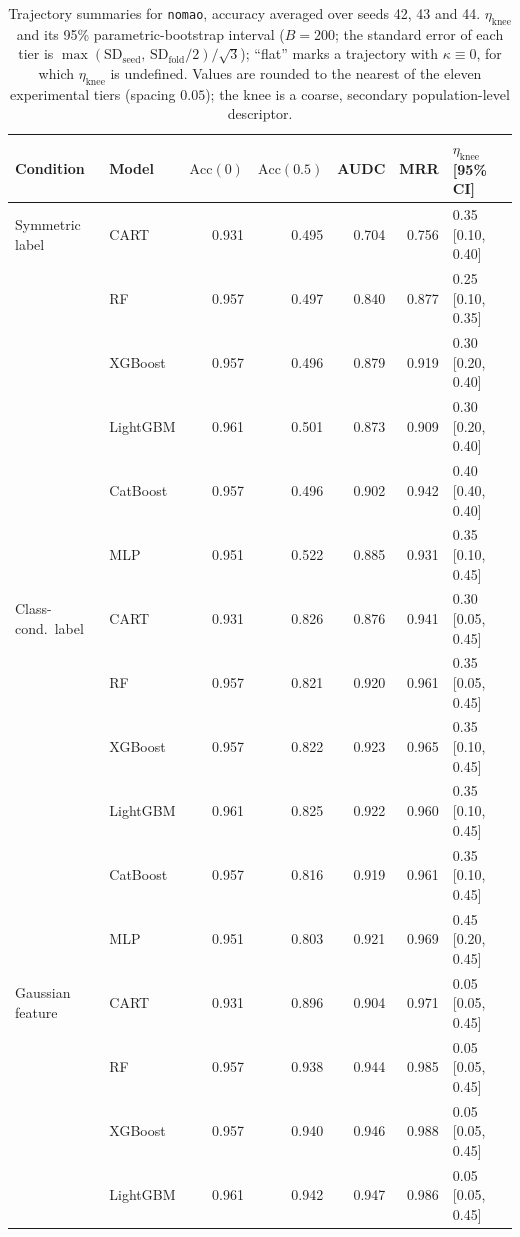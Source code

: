\documentclass[pdflatex,sn-mathphys]{sn-jnl}
\theoremstyle{thmstyleone}
\begin{document}
\begin{table}[htbp]
\centering
\scriptsize
\setlength{\tabcolsep}{3.5pt}
\caption{Trajectory summaries for \texttt{nomao}, accuracy averaged over seeds 42, 43 and 44. $\eta_{\mathrm{knee}}$ and its 95\% parametric-bootstrap interval ($B=200$; the standard error of each tier is $\max(\mathrm{SD}_{\mathrm{seed}},\,\mathrm{SD}_{\mathrm{fold}}/2)/\sqrt3$); ``flat'' marks a trajectory with $\kappa\equiv 0$, for which $\eta_{\mathrm{knee}}$ is undefined. Values are rounded to the nearest of the eleven experimental tiers (spacing $0.05$); the knee is a coarse, secondary population-level descriptor.}
\label{tab:traj_nomao}
\begin{tabular}{@{}llrrrrl@{}}
\toprule
Condition & Model & $\mathrm{Acc}(0)$ & $\mathrm{Acc}(0.5)$ & AUDC & MRR & $\eta_{\mathrm{knee}}$ [95\% CI] \\
\midrule
Symmetric label & CART & 0.931 & 0.495 & 0.704 & 0.756 & 0.35 [0.10, 0.40] \\
 & RF & 0.957 & 0.497 & 0.840 & 0.877 & 0.25 [0.10, 0.35] \\
 & XGBoost & 0.957 & 0.496 & 0.879 & 0.919 & 0.30 [0.20, 0.40] \\
 & LightGBM & 0.961 & 0.501 & 0.873 & 0.909 & 0.30 [0.20, 0.40] \\
 & CatBoost & 0.957 & 0.496 & 0.902 & 0.942 & 0.40 [0.40, 0.40] \\
 & MLP & 0.951 & 0.522 & 0.885 & 0.931 & 0.35 [0.10, 0.45] \\
\midrule
Class-cond.\ label & CART & 0.931 & 0.826 & 0.876 & 0.941 & 0.30 [0.05, 0.45] \\
 & RF & 0.957 & 0.821 & 0.920 & 0.961 & 0.35 [0.05, 0.45] \\
 & XGBoost & 0.957 & 0.822 & 0.923 & 0.965 & 0.35 [0.10, 0.45] \\
 & LightGBM & 0.961 & 0.825 & 0.922 & 0.960 & 0.35 [0.10, 0.45] \\
 & CatBoost & 0.957 & 0.816 & 0.919 & 0.961 & 0.35 [0.10, 0.45] \\
 & MLP & 0.951 & 0.803 & 0.921 & 0.969 & 0.45 [0.20, 0.45] \\
\midrule
Gaussian feature & CART & 0.931 & 0.896 & 0.904 & 0.971 & 0.05 [0.05, 0.45] \\
 & RF & 0.957 & 0.938 & 0.944 & 0.985 & 0.05 [0.05, 0.45] \\
 & XGBoost & 0.957 & 0.940 & 0.946 & 0.988 & 0.05 [0.05, 0.45] \\
 & LightGBM & 0.961 & 0.942 & 0.947 & 0.986 & 0.05 [0.05, 0.45] \\

\end{tabular}
\end{table}
\end{document}
